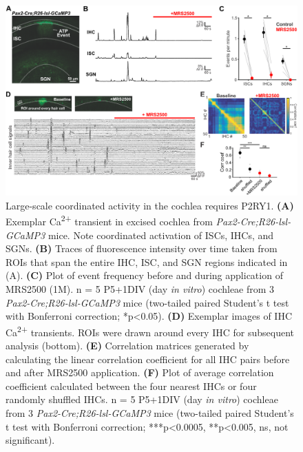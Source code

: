 \documentclass[9pt,lineno]{elife}
\begin{document}
\begin{figure}
\begin{fullwidth}
\includegraphics[width=.95\linewidth]{figures/Fig5.pdf}
\caption{Large-scale coordinated activity in the cochlea requires P2RY1.
\textbf{(A)} Exemplar Ca\textsuperscript{2+} transient in excised cochlea from \textit{Pax2-Cre;R26-lsl-GCaMP3} mice. Note coordinated activation of ISCs, IHCs, and SGNs. 
\textbf{(B)} Traces of fluorescence intensity over time taken from ROIs that span the entire IHC, ISC, and SGN regions indicated in (A).
\textbf{(C)} Plot of event frequency before and during application of MRS2500 (1\textmu M). n = 5 P5+1DIV (day \textit{in vitro}) cochleae from 3 \textit{Pax2-Cre;R26-lsl-GCaMP3} mice (two-tailed paired Student's t test with Bonferroni correction; *p<0.05).
\textbf{(D)} Exemplar images of IHC Ca\textsuperscript{2+} transients. ROIs were drawn around every IHC for subsequent analysis (bottom). 
\textbf{(E)} Correlation matrices generated by calculating the linear correlation coefficient for all IHC pairs before and after MRS2500 application.
\textbf{(F)} Plot of average correlation coefficient calculated between the four nearest IHCs or four randomly shuffled IHCs. n = 5 P5+1DIV (day \textit{in vitro}) cochleae from 3 \textit{Pax2-Cre;R26-lsl-GCaMP3} mice (two-tailed paired Student's t test with Bonferroni correction; ***p<0.0005, **p<0.005, ns, not significant).
}
\label{fig:f5}
\end{fullwidth}
\end{figure}
\end{document}
